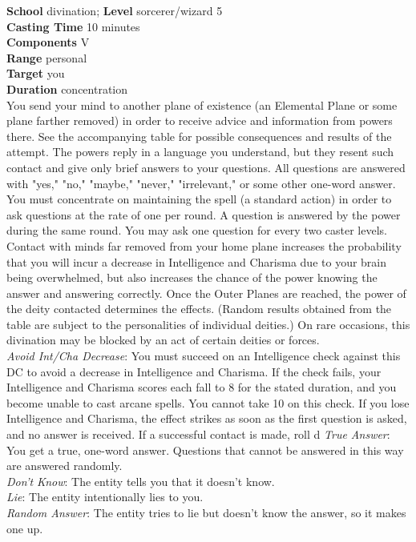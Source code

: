 \textbf{School} divination; \textbf{Level} sorcerer/wizard 5\\
\textbf{Casting Time} 10 minutes\\
\textbf{Components} V\\
\textbf{Range} personal\\
\textbf{Target} you\\
\textbf{Duration} concentration\\
You send your mind to another plane of existence (an Elemental Plane or some plane farther removed) in order to receive advice and information from powers there. See the accompanying table for possible consequences and results of the attempt. The powers reply in a language you understand, but they resent such contact and give only brief answers to your questions. All questions are answered with "yes," "no," "maybe," "never," "irrelevant," or some other one-word answer.\\
You must concentrate on maintaining the spell (a standard action) in order to ask questions at the rate of one per round. A question is answered by the power during the same round. You may ask one question for every two caster levels.\\
Contact with minds far removed from your home plane increases the probability that you will incur a decrease in Intelligence and Charisma due to your brain being overwhelmed, but also increases the chance of the power knowing the answer and answering correctly. Once the Outer Planes are reached, the power of the deity contacted determines the effects. (Random results obtained from the table are subject to the personalities of individual deities.) On rare occasions, this divination may be blocked by an act of certain deities or forces.\\
\textit{Avoid Int/Cha Decrease}: You must succeed on an Intelligence check against this DC to avoid a decrease in Intelligence and Charisma. If the check fails, your Intelligence and Charisma scores each fall to 8 for the stated duration, and you become unable to cast arcane spells. You cannot take 10 on this check. If you lose Intelligence and Charisma, the effect strikes as soon as the first question is asked, and no answer is received. If a successful contact is made, roll d%
\textit{True Answer}: You get a true, one-word answer. Questions that cannot be answered in this way are answered randomly.\\
\textit{Don't Know}: The entity tells you that it doesn't know.\\
\textit{Lie}: The entity intentionally lies to you.\\
\textit{Random Answer}: The entity tries to lie but doesn't know the answer, so it makes one up.\\
